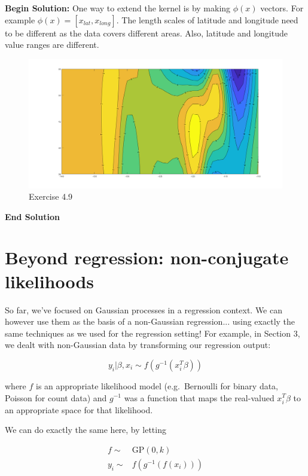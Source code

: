 \documentclass[twoside]{article}
\begin{document}
\textbf{Begin Solution:}
One way to extend the kernel is by making $\phi(x)$ vectors. For example $\phi(x)=[x_{lat},x_{long}]$. The length scales of latitude and longitude need to be different as the data covers different areas. Also, latitude and longitude value ranges are different.\\
\begin{figure}[H]
\begin{center}
\includegraphics[width=\textwidth]{./Exercise49/Exercise49.png}
\end{center}
\caption{Exercise 4.9}
\end{figure}
\textbf{End Solution}

 \section{Beyond regression: non-conjugate likelihoods}

 So far, we've focused on Gaussian processes in a regression context. We can however use them as the basis of a non-Gaussian regression... using exactly the same techniques as we used for the regression setting! For example, in Section 3, we dealt with non-Gaussian data by transforming our regression output:

 $$y_i|\beta,x_i \sim f(g^{-1}(x_i^T\beta))$$

 where $f$ is an appropriate likelihood model (e.g.\ Bernoulli for binary data, Poisson for count data) and $g^{-1}$ was a function that maps the real-valued $x_i^T\beta$ to an appropriate space for that likelihood.


 We can do exactly the same here, by letting

 $$\begin{aligned}f \sim& \mbox{GP}(0, k)\\
   y_i \sim&f(g^{-1}(f(x_i)))\end{aligned}
 $$
\end{document}
